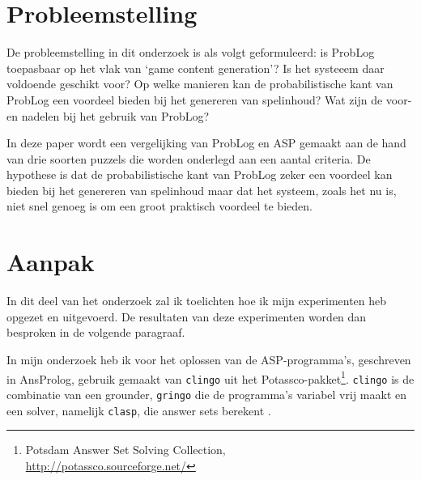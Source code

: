 \documentclass{article}
\begin{document}
\section{Probleemstelling}
De probleemstelling in dit onderzoek is als volgt geformuleerd: is ProbLog toepasbaar op het vlak van `game content generation'? Is het systeeem daar voldoende geschikt voor? Op welke manieren kan de probabilistische kant van ProbLog een voordeel bieden bij het genereren van spelinhoud? Wat zijn de voor- en nadelen bij het gebruik van ProbLog? 

In deze paper wordt een vergelijking van ProbLog en ASP gemaakt aan de hand van drie soorten puzzels die worden onderlegd aan een aantal criteria. De hypothese is dat de probabilistische kant van ProbLog zeker een voordeel kan bieden bij het genereren van spelinhoud maar dat het systeem, zoals het nu is, niet snel genoeg is om een groot praktisch voordeel te bieden.
 
\section{Aanpak}
In dit deel van het onderzoek zal ik toelichten hoe ik mijn experimenten heb opgezet en uitgevoerd. De resultaten van deze experimenten worden dan besproken in de volgende paragraaf.

 In mijn onderzoek heb ik voor het oplossen van de ASP-programma's, geschreven in AnsProlog, gebruik gemaakt van  \texttt{clingo} uit het Potassco-pakket\footnote{Potsdam Answer Set Solving Collection, \\\url{http://potassco.sourceforge.net/}}. \texttt{clingo} is de combinatie van een grounder, \texttt{gringo} die de programma's variabel vrij maakt en een solver, namelijk \texttt{clasp}, die answer sets berekent \cite{clingo}. 
\end{document}
